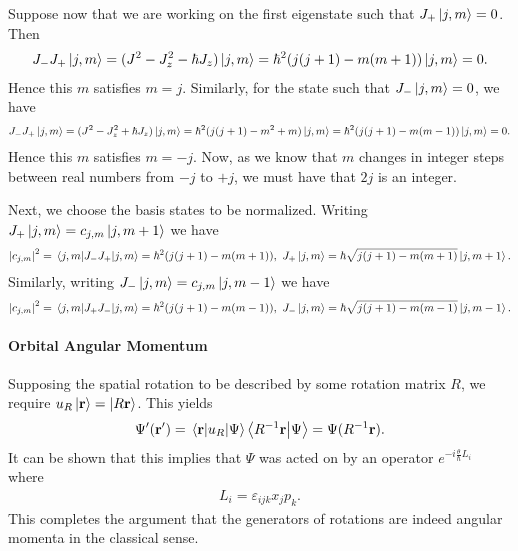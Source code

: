 Suppose now that we are working on the first eigenstate such that $J_{+}\ket{j, m} = 0$. Then
\begin{align*}
	J_{-}J_{+}\ket{j, m} = (J^{2} - J_{z}^{2} - \hbar J_{z})\ket{j, m} = \hbar^{2}(j(j + 1) - m(m + 1))\ket{j, m} = 0.
\end{align*}
Hence this $m$ satisfies $m = j$. Similarly, for the state such that $J_{-}\ket{j, m} = 0$, we have
\begin{align*}
	J_{-}J_{+}\ket{j, m} = (J^{2} - J_{z}^{2} + \hbar J_{z})\ket{j, m} = \hbar^{2}(j(j + 1) - m^{2} + m)\ket{j, m} = \hbar^{2}(j(j + 1) - m(m - 1))\ket{j, m} = 0.
\end{align*}
Hence this $m$ satisfies $m = -j$. Now, as we know that $m$ changes in integer steps between real numbers from $-j$ to $+j$, we must have that $2j$ is an integer.

Next, we choose the basis states to be normalized. Writing $J_{+}\ket{j, m} = c_{j, m}\ket{j, m + 1}$ we have
\begin{align*}
	\abs{c_{j, m}}^{2} = \expval{J_{-}J_{+}}{j, m} = \hbar^{2}(j(j + 1) - m(m + 1)),\ J_{+}\ket{j, m} = \hbar\sqrt{j(j + 1) - m(m + 1)}\ket{j, m + 1}.
\end{align*}
Similarly, writing $J_{-}\ket{j, m} = c_{j, m}\ket{j, m - 1}$ we have
\begin{align*}
	\abs{c_{j, m}}^{2} = \expval{J_{+}J_{-}}{j, m} = \hbar^{2}(j(j + 1) - m(m - 1)),\ J_{-}\ket{j, m} = \hbar\sqrt{j(j + 1) - m(m - 1)}\ket{j, m - 1}.
\end{align*}

\paragraph{Orbital Angular Momentum}
Supposing the spatial rotation to be described by some rotation matrix $R$, we require $u_{R}\ket{\vb{r}} = \ket{R\vb{r}}$. This yields
\begin{align*}
	\Psi^{\prime}(\vb{r}^{\prime}) = \mel{\vb{r}}{u_{R}}{\Psi} \braket{R^{-1}\vb{r}}{\Psi} = \Psi(R^{-1}\vb{r}).
\end{align*}
It can be shown that this implies that $\Psi$ was acted on by an operator $e^{-i\frac{\theta}{\hbar}L_{i}}$ where
\begin{align*}
	L_{i} = \varepsilon_{ijk}x_{j}p_{k}.
\end{align*}
This completes the argument that the generators of rotations are indeed angular momenta in the classical sense.

